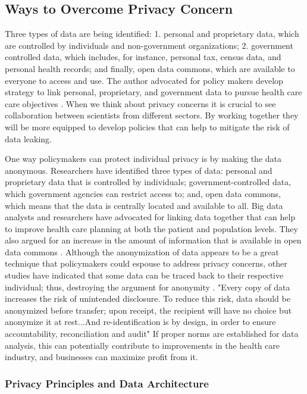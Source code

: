 \documentclass[sigconf]{acmart}
\begin{document}
\subsection{Ways to Overcome Privacy Concern}


Three types of data are being identified: 1. personal and proprietary data, which are controlled by individuals and non-government organizations; 2. government controlled data, which includes, for instance, personal tax, census data, and personal health records; and finally, open data commons, which are available to everyone to access and use. The author advocated for policy makers develop strategy to link personal, proprietary, and government data to pursue health care care objectives \cite{van2011health}. When we think about privacy concerns it is crucial to see collaboration between scientists from different sectors. By working together they will be more equipped to develop policies that can help to mitigate the risk of data leaking.

One way policymakers can protect individual privacy is by making the data anonymous. Researchers have identified three types of data: personal and proprietary data that is controlled by individuals; government-controlled data, which government agencies can restrict access to; and, open data commons, which means that the data is centrally located and available to all. Big data analysts and researchers have advocated for linking data together that can help to improve health care planning at both the patient and population levels. They also argued for an increase in the amount of information that is available in open data commons \cite{roski2014creating}. Although the anonymization of data appears to be a great technique that policymakers could espouse to address privacy concerns, other studies have indicated that some data can be traced back to their respective individual; thus, destroying the argument for anonymity \cite{van2011health}.  "Every copy of data increases the risk of unintended disclosure. To reduce this risk, data should be anonymized before transfer; upon receipt, the recipient will have no choice but anonymize it at rest...And re-identification is by design, in order to ensure accountability, reconciliation and audit" \cite{cavoukian2012privacy} If proper norms are established for data analysis, this can potentially contribute to improvements in the health care industry, and businesses can maximize profit from it. 


\subsubsection{Privacy Principles and Data Architecture}
\end{document}
